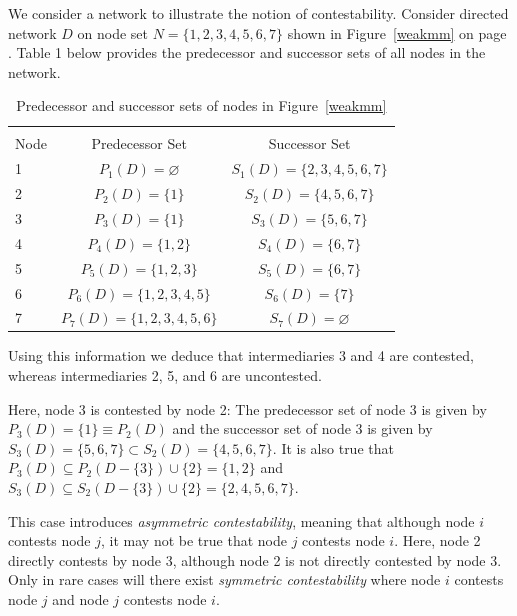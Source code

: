 \begin{example} \label{Simple Contestability}
We consider a network to illustrate the notion of contestability. Consider directed network $D$ on node set $N = \{1,2,3,4,5,6,7\}$ shown in Figure~\ref{weakmm} on page \pageref{weakmm}. Table 1 below provides the predecessor and successor sets of all nodes in the network.

\begin{table}[h]
\begin{center}
\begin{tabu}{ l c c }

\\[-1.8ex]\hline
\hline \\[-1.8ex]
Node & Predecessor Set                 & Successor Set                     \\     & $P_{1}(D)=\varnothing$          & $S_{1}(D)=\{2,3,4,5,6,7\}$        \\
2    & $P_{2}(D)=\{1\}$                & $S_{2}(D)=\{4,5,6,7\}$            \\
3    & $P_{3}(D)=\{1\}$                & $S_{3}(D)=\{5,6,7\}$              \\
4    & $P_{4}(D)=\{1,2\}$              & $S_{4}(D)=\{6,7\}$                \\
5    & $P_{5}(D)=\{1,2,3\}$            & $S_{5}(D)=\{6,7\}$                \\
6    & $P_{6}(D)=\{1,2,3,4,5\}$        & $S_{6}(D)=\{7\}$                  \\
7    & $P_{7}(D)=\{1,2,3,4,5,6\}$      & $S_{7}(D)=\varnothing$            \\ \hline
\end{tabu}\par
\caption{Predecessor and successor sets of nodes in Figure~\ref{weakmm}}
\label{network1stats}
\end{center}
\end{table}

\noindent
Using this information we deduce that intermediaries 3 and 4 are contested, whereas intermediaries 2, 5, and 6 are uncontested.

Here, node 3 is contested by node 2: The predecessor set of node 3 is given by $P_{3}(D) = \{1\} \equiv P_{2}(D)$ and the successor set of node 3 is given by $S_{3}(D) = \{5,6,7\} \subset S_{2}(D) = \{4,5,6,7\}$. It is also true that $P_{3}(D) \subseteq P_{2}(D - \{3\}) \cup \{2\} = \{ 1,2 \}$ and $S_{3}(D) \subseteq S_{2}(D - \{3\}) \cup \{2\} = \{ 2,4,5,6,7 \}$.

This case introduces \textit{asymmetric contestability}, meaning that although node $i$ contests node $j$, it may not be true that node $j$ contests node $i$. Here, node 2 directly contests by node 3, although node 2 is not directly contested by node 3. Only in rare cases will there exist \textit{symmetric contestability} where node $i$ contests node $j$ and node $j$ contests node $i$.
\end{example}


